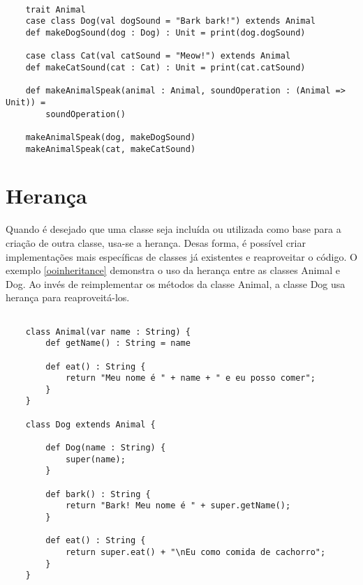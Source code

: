\begin{lstlisting}[caption={Interfaces em Programação Funcional},label=fpinterface2]
    
    trait Animal
    case class Dog(val dogSound = "Bark bark!") extends Animal
    def makeDogSound(dog : Dog) : Unit = print(dog.dogSound)
    
    case class Cat(val catSound = "Meow!") extends Animal
    def makeCatSound(cat : Cat) : Unit = print(cat.catSound)

    def makeAnimalSpeak(animal : Animal, soundOperation : (Animal => Unit)) =
        soundOperation()
    
    makeAnimalSpeak(dog, makeDogSound)
    makeAnimalSpeak(cat, makeCatSound)

\end{lstlisting}

\section{Herança}

Quando é desejado que uma classe seja incluída ou 
utilizada como base para a criação de outra classe, 
usa-se a herança\cite{quarkoo}. Desas forma, é 
possível criar implementações mais específicas 
de classes já existentes e reaproveitar o código. 
O exemplo \ref{ooinheritance} demonstra 
o uso da herança entre as classes Animal e Dog. 
Ao invés de reimplementar os métodos da classe 
Animal, a classe Dog usa herança para reaproveitá-los. 

\begin{lstlisting}[caption={Herança em Orientação a Objetos},label=ooinheritance]
    
    class Animal(var name : String) {
        def getName() : String = name
        
        def eat() : String {
            return "Meu nome é " + name + " e eu posso comer";
        }
    }

    class Dog extends Animal {
        
        def Dog(name : String) {
            super(name);
        }

        def bark() : String {
            return "Bark! Meu nome é " + super.getName();
        }

        def eat() : String {
            return super.eat() + "\nEu como comida de cachorro";
        }
    }

\end{lstlisting}

